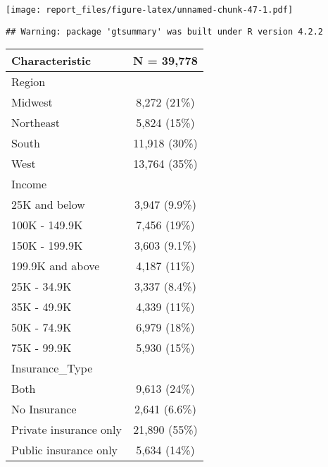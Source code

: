 \documentclass[
]{article}
\begin{document}
\texttt{[image: report\_files/figure-latex/unnamed-chunk-47-1.pdf]}

\begin{verbatim}
## Warning: package 'gtsummary' was built under R version 4.2.2
\end{verbatim}

\begin{longtable}[]{@{}lc@{}}
\toprule()
\textbf{Characteristic} & \textbf{N = 39,778} \\
\midrule()
\endhead
Region & \\
Midwest & 8,272 (21\%) \\
Northeast & 5,824 (15\%) \\
South & 11,918 (30\%) \\
West & 13,764 (35\%) \\
Income & \\
25K and below & 3,947 (9.9\%) \\
100K - 149.9K & 7,456 (19\%) \\
150K - 199.9K & 3,603 (9.1\%) \\
199.9K and above & 4,187 (11\%) \\
25K - 34.9K & 3,337 (8.4\%) \\
35K - 49.9K & 4,339 (11\%) \\
50K - 74.9K & 6,979 (18\%) \\
75K - 99.9K & 5,930 (15\%) \\
Insurance\_Type & \\
Both & 9,613 (24\%) \\
No Insurance & 2,641 (6.6\%) \\
Private insurance only & 21,890 (55\%) \\
Public insurance only & 5,634 (14\%) \\
\bottomrule()
\end{longtable}
\end{document}
